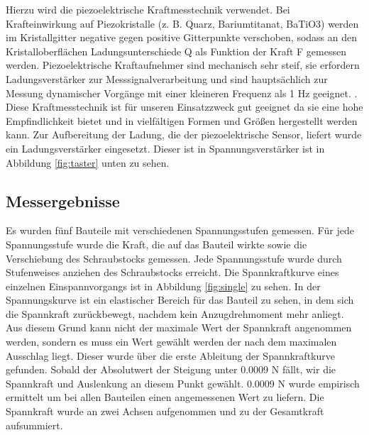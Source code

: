 Hierzu wird die piezoelektrische Kraftmesstechnik verwendet.
Bei Krafteinwirkung auf Piezokristalle (z. B. Quarz, Bariumtitanat, BaTiO3) 
werden im Kristallgitter negative gegen positive Gitterpunkte
verschoben, sodass an den Kristalloberflächen
Ladungsunterschiede Q als Funktion der Kraft F
gemessen werden.
Piezoelektrische Kraftaufnehmer sind mechanisch sehr steif, 
sie erfordern Ladungsverstärker
zur Messsignalverarbeitung und sind hauptsächlich zur Messung dynamischer Vorgänge
mit einer kleineren Frequenz als 1 Hz geeignet. \cite{Czichos.2020}. 
Diese Kraftmesstechnik ist 
für unseren Einsatzzweck gut geeignet da sie eine hohe Empfindlichkeit bietet 
und in vielfältigen Formen und Größen hergestellt werden kann. Zur Aufbereitung 
der Ladung, die der piezoelektrische Sensor, liefert wurde ein Ladungsverstärker 
eingesetzt.\cite{Schwartz.2006}
Dieser ist in Spannungsverstärker ist in Abbildung \ref{fig:taster} unten zu sehen.

\subsection{Messergebnisse}

Es wurden fünf Bauteile mit verschiedenen Spannungsstufen gemessen. Für jede 
Spannungsstufe wurde die Kraft, die auf das Bauteil wirkte sowie die Verschiebung 
des Schraubstocks gemessen.
Jede Spannungsstufe wurde durch Stufenweises anziehen des Schraubstocks erreicht.
Die Spannkraftkurve eines einzelnen Einspannvorgangs ist in 
Abbildung \ref{fig:single} zu sehen. 
In der Spannungskurve ist ein elastischer Bereich für das 
Bauteil zu sehen, in dem sich die Spannkraft zurückbewegt, nachdem kein 
Anzugdrehmoment mehr anliegt. Aus diesem Grund kann nicht der maximale Wert der Spannkraft angenommen werden, 
sondern es muss ein Wert gewählt werden der nach dem maximalen Ausschlag liegt.
Dieser wurde über die erste Ableitung der Spannkraftkurve gefunden. Sobald der 
Absolutwert der Steigung unter 0.0009 N fällt, wir die Spannkraft und Auslenkung an 
diesem Punkt gewählt. 0.0009 N wurde empirisch ermittelt um bei allen Bauteilen einen 
angemessenen Wert zu liefern.
Die Spannkraft wurde an zwei Achsen aufgenommen und zu der Gesamtkraft aufsummiert.

